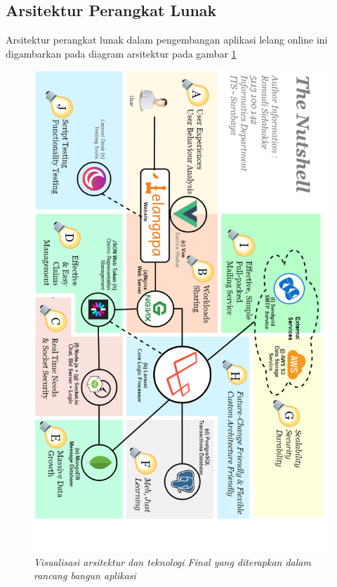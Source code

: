 
\subsection{Arsitektur Perangkat Lunak}
	\label{final-arch-tech}
	Arsitektur perangkat lunak dalam pengembangan aplikasi lelang online ini digambarkan pada diagram arsitektur pada gambar \ref{final-arch-tech-figure}
	\newpage
	\begin{figure}[H]
		\centering
		\includegraphics[height=.9\textheight]{images/bab3/arsitektur-app-pl_2.png}
		\caption{\textit{Visualisasi arsitektur dan teknologi Final yang diterapkan dalam rancang bangun aplikasi}}
			\label{final-arch-tech-figure}
	\end{figure}
	
	
